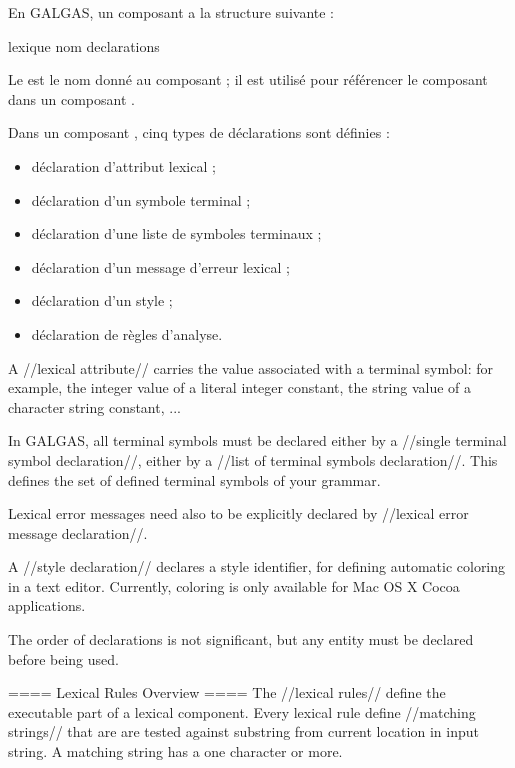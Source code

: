 En GALGAS, un composant  a la structure suivante :

{
\begin{galgascode}
lexique nom {
  declarations
}
\end{galgascode}

Le  est le nom donné au composant ; il est utilisé pour référencer le composant  dans un composant .


Dans un composant , cinq types de déclarations sont définies :
\begin{itemize}
  \item déclaration d'attribut lexical ;
  \item déclaration d'un symbole terminal ;
  \item déclaration d'une liste de symboles terminaux ;
  \item déclaration d'un message d'erreur lexical ;
  \item déclaration d'un style ;
  \item déclaration de règles d'analyse.
\end{itemize}

A //lexical attribute// carries the value associated with a terminal symbol: for example, the integer value of a literal integer constant, the string value of a character string constant, ...

In GALGAS, all terminal symbols must be declared either by a //single terminal symbol declaration//, either by a //list of terminal symbols declaration//. This defines the set of defined terminal symbols of your grammar.

Lexical error messages need also to be explicitly declared by //lexical error message declaration//. 

A //style declaration// declares a style identifier, for defining automatic coloring in a text editor. Currently, coloring is only available for Mac OS X Cocoa applications.

The order of declarations is not significant, but any entity must be declared before being used.

==== Lexical Rules Overview ====
The //lexical rules// define the executable part of a lexical component. Every lexical rule define //matching strings// that are are tested against substring from current location in input string. A matching string has a one character or more.

}
